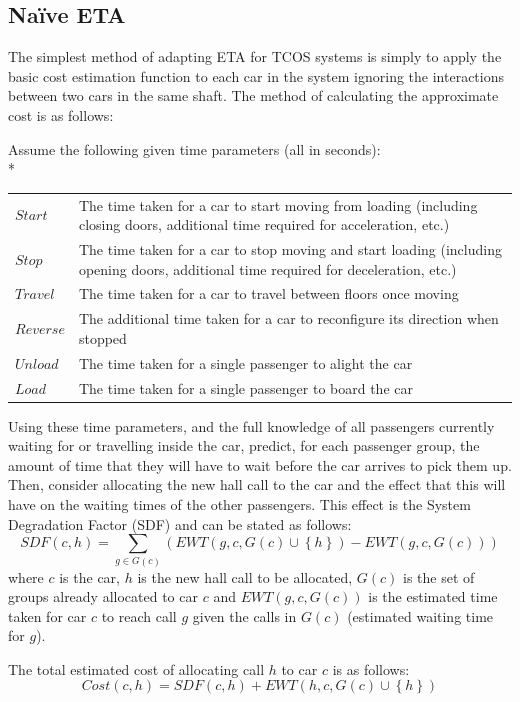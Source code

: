 \documentclass{UoYCSproject}
\begin{document}
\subsection{Na\"{i}ve ETA}

The simplest method of adapting ETA for TCOS systems is simply to apply the basic cost estimation function to each car in the system ignoring the interactions between two cars in the same shaft.  The method of calculating the approximate cost is as follows:

Assume the following given time parameters (all in seconds):\\*
\begin{tabularx}{\linewidth}{l X}
	$Start$		& The time taken for a car to start moving from loading (including closing doors, additional time required for acceleration, etc.) \\
	$Stop$		& The time taken for a car to stop moving and start loading (including opening doors, additional time required for deceleration, etc.) \\
	$Travel$	& The time taken for a car to travel between floors once moving \\
	$Reverse$	& The additional time taken for a car to reconfigure its direction when stopped \\
	$Unload$	& The time taken for a single passenger to alight the car \\
	$Load$		& The time taken for a single passenger to board the car
\end{tabularx}

Using these time parameters, and the full knowledge of all passengers currently waiting for or travelling inside the car, predict, for each passenger group, the amount of time that they will have to wait before the car arrives to pick them up.  Then, consider allocating the new hall call to the car and the effect that this will have on the waiting times of the other passengers.  This effect is the System Degradation Factor (SDF) and can be stated as follows:
\[ SDF(c, h) = \sum\limits_{g \in G(c)} (EWT(g, c, G(c) \cup \left\{ h \right\}) - EWT(g, c, G(c)))\]
where $c$ is the car, $h$ is the new hall call to be allocated, $G(c)$ is the set of groups already allocated to car $c$ and $EWT(g,c,G(c))$ is the estimated time taken for car $c$ to reach call $g$ given the calls in $G(c)$ (estimated waiting time for $g$).

The total estimated cost of allocating call $h$ to car $c$ is as follows:
\[ Cost(c, h) = SDF(c, h) + EWT(h, c, G(c) \cup \left\{ h \right\}) \]
\end{document}
